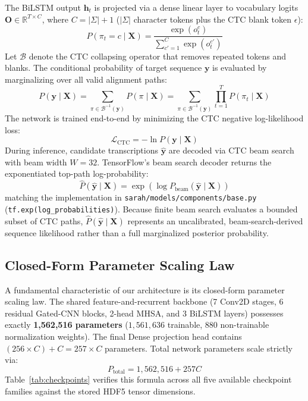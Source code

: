\documentclass{IEEEtran}
\begin{document}
The BiLSTM output $\mathbf{h}_t$ is projected via a dense linear layer to vocabulary logits $\mathbf{O} \in \mathbb{R}^{T \times C}$, where $C = |\Sigma| + 1$ ($|\Sigma|$ character tokens plus the CTC blank token $\epsilon$):
\begin{equation}
P(\pi_t = c \mid \mathbf{X}) = \frac{\exp(o_t^c)}{\sum_{c'=1}^{C} \exp(o_t^{c'})}
\end{equation}
\noindent Let $\mathcal{B}$ denote the CTC collapsing operator that removes repeated tokens and blanks. The conditional probability of target sequence $\mathbf{y}$ is evaluated by marginalizing over all valid alignment paths:
\begin{equation}
P(\mathbf{y} \mid \mathbf{X}) = \sum_{\pi \in \mathcal{B}^{-1}(\mathbf{y})} P(\pi \mid \mathbf{X}) = \sum_{\pi \in \mathcal{B}^{-1}(\mathbf{y})} \prod_{t=1}^{T} P(\pi_t \mid \mathbf{X})
\end{equation}
\noindent The network is trained end-to-end by minimizing the CTC negative log-likelihood loss:
\begin{equation}
\mathcal{L}_{\text{CTC}} = -\ln P(\mathbf{y} \mid \mathbf{X})
\label{eq:ctc_loss}
\end{equation}
\noindent During inference, candidate transcriptions $\hat{\mathbf{y}}$ are decoded via CTC beam search with beam width $W=32$. TensorFlow's beam search decoder returns the exponentiated top-path log-probability:
\begin{equation}
\hat{P}(\hat{\mathbf{y}} \mid \mathbf{X}) = \exp\left( \log P_{\text{beam}}(\hat{\mathbf{y}} \mid \mathbf{X}) \right)
\label{eq:beam_likelihood}
\end{equation}
matching the implementation in \texttt{sarah/models/components/base.py} (\texttt{tf.exp(log\_probabilities)}). Because finite beam search evaluates a bounded subset of CTC paths, $\hat{P}(\hat{\mathbf{y}} \mid \mathbf{X})$ represents an uncalibrated, beam-search-derived sequence likelihood rather than a full marginalized posterior probability.

\subsection{Closed-Form Parameter Scaling Law}

A fundamental characteristic of our architecture is its closed-form parameter scaling law. The shared feature-and-recurrent backbone (7 Conv2D stages, 6 residual Gated-CNN blocks, 2-head MHSA, and 3 BiLSTM layers) possesses exactly \textbf{1,562,516 parameters} ($1,561,636$ trainable, $880$ non-trainable normalization weights). The final Dense projection head contains $(256 \times C) + C = 257 \times C$ parameters. Total network parameters scale strictly via:
\begin{equation}
P_{\text{total}} = 1,562,516 + 257C
\label{eq:param_scaling}
\end{equation}
\noindent Table~\ref{tab:checkpoints} verifies this formula across all five available checkpoint families against the stored HDF5 tensor dimensions.
\end{document}
